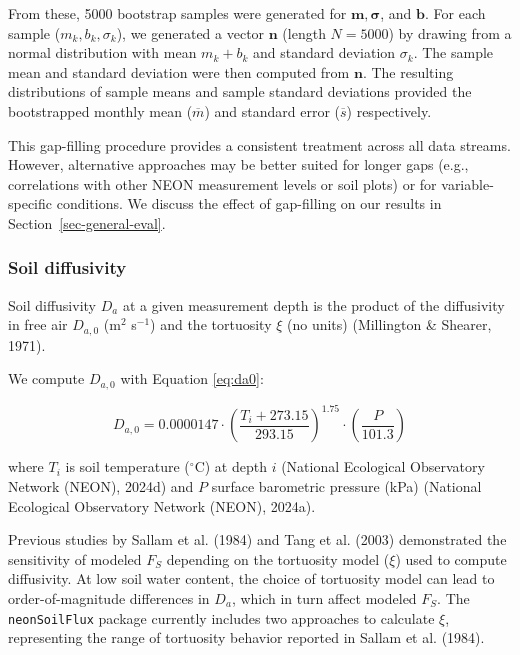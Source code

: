 \documentclass[
  letterpaper,
  DIV=11,
  numbers=noendperiod]{scrartcl}
\begin{document}
From these, 5000 bootstrap samples were generated for
\(\mathbf{m}, \boldsymbol\sigma\), and \(\mathbf{b}\). For each sample
(\(m_k, b_k, \sigma_k\)), we generated a vector \(\mathbf{n}\) (length
\(N=5000\)) by drawing from a normal distribution with mean \(m_k+b_k\)
and standard deviation \(\sigma_k\). The sample mean and standard
deviation were then computed from \(\mathbf{n}\). The resulting
distributions of sample means and sample standard deviations provided
the bootstrapped monthly mean (\(\overline{m}\)) and standard error
(\(\overline{s}\)) respectively.

This gap-filling procedure provides a consistent treatment across all
data streams. However, alternative approaches may be better suited for
longer gaps (e.g., correlations with other NEON measurement levels or
soil plots) or for variable-specific conditions. We discuss the effect
of gap-filling on our results in Section~\ref{sec-general-eval}.

\subsubsection{Soil diffusivity}\label{sec-compute-diffusivity}

Soil diffusivity \(D_{a}\) at a given measurement depth is the product
of the diffusivity in free air \(D_{a,0}\) (m\(^{2}\) s\(^{-1}\)) and
the tortuosity \(\xi\) (no units) (Millington \& Shearer, 1971).

We compute \(D_{a,0}\) with Equation \ref{eq:da0}:

\begin{equation}
  D_{a,0} = 0.0000147 \cdot \left( \frac{T_{i} + 273.15}{293.15} \right)^{1.75} \cdot \left( \frac{P}{101.3} \right)
  \label{eq:da0}
\end{equation}

where \(T_{i}\) is soil temperature (\(^\circ\)C) at depth \(i\)
(National Ecological Observatory Network (NEON), 2024d) and \(P\)
surface barometric pressure (kPa) (National Ecological Observatory
Network (NEON), 2024a).

Previous studies by Sallam et al. (1984) and Tang et al. (2003)
demonstrated the sensitivity of modeled \(F_{S}\) depending on the
tortuosity model (\(\xi\)) used to compute diffusivity. At low soil
water content, the choice of tortuosity model can lead to
order-of-magnitude differences in \(D_{a}\), which in turn affect
modeled \(F_{S}\). The \texttt{neonSoilFlux} package currently includes
two approaches to calculate \(\xi\), representing the range of
tortuosity behavior reported in Sallam et al. (1984).
\end{document}
